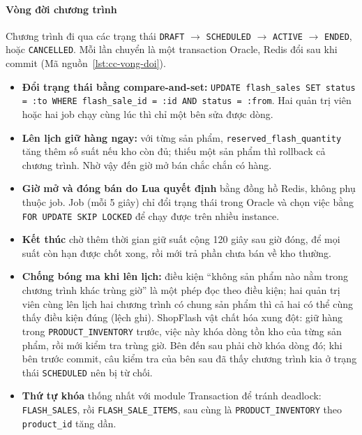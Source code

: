 \paragraph{Vòng đời chương trình}
Chương trình đi qua các trạng thái \texttt{DRAFT} $\rightarrow$ \texttt{SCHEDULED} $\rightarrow$ \texttt{ACTIVE} $\rightarrow$ \texttt{ENDED}, hoặc \texttt{CANCELLED}. Mỗi lần chuyển là một transaction Oracle, Redis đổi sau khi commit (Mã nguồn~\ref{lst:cc-vong-doi}).

\begin{itemize}
  \item \textbf{Đổi trạng thái bằng compare-and-set:} \texttt{UPDATE flash\_\allowbreak sales SET status = :\allowbreak to WHERE flash\_\allowbreak sale\_\allowbreak id = :\allowbreak id AND status = :\allowbreak from}. Hai quản trị viên hoặc hai job chạy cùng lúc thì chỉ một bên sửa được dòng.
  \item \textbf{Lên lịch giữ hàng ngay:} với từng sản phẩm, \texttt{reserved\_\allowbreak flash\_\allowbreak quantity} tăng thêm số suất nếu kho còn đủ; thiếu một sản phẩm thì rollback cả chương trình. Nhờ vậy đến giờ mở bán chắc chắn có hàng.
  \item \textbf{Giờ mở và đóng bán do Lua quyết định} bằng đồng hồ Redis, không phụ thuộc job. Job (mỗi 5 giây) chỉ đổi trạng thái trong Oracle và chọn việc bằng \texttt{FOR UPDATE SKIP LOCKED} để chạy được trên nhiều instance.
  \item \textbf{Kết thúc} chờ thêm thời gian giữ suất cộng 120 giây sau giờ đóng, để mọi suất còn hạn được chốt xong, rồi mới trả phần chưa bán về kho thường.
  \item \textbf{Chống bóng ma khi lên lịch:} điều kiện ``không sản phẩm nào nằm trong chương trình khác trùng giờ'' là một phép đọc theo điều kiện; hai quản trị viên cùng lên lịch hai chương trình có chung sản phẩm thì cả hai có thể cùng thấy điều kiện đúng (lệch ghi). ShopFlash vật chất hóa xung đột: giữ hàng trong \texttt{PRODUCT\_\allowbreak INVENTORY} trước, việc này khóa dòng tồn kho của từng sản phẩm, rồi mới kiểm tra trùng giờ. Bên đến sau phải chờ khóa dòng đó; khi bên trước commit, câu kiểm tra của bên sau đã thấy chương trình kia ở trạng thái \texttt{SCHEDULED} nên bị từ chối.
  \item \textbf{Thứ tự khóa} thống nhất với module Transaction để tránh deadlock: \texttt{FLASH\_\allowbreak SALES}, rồi \texttt{FLASH\_\allowbreak SALE\_\allowbreak ITEMS}, sau cùng là \texttt{PRODUCT\_\allowbreak INVENTORY} theo \texttt{product\_\allowbreak id} tăng dần.
\end{itemize}


